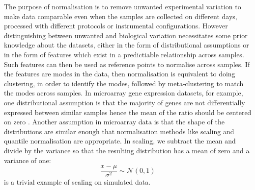 The purpose of normalisation is to remove unwanted experimental variation to make data comparable even when the samples are
collected on different days, processed with different protocols or instrumental configurations.
However distinguishing between unwanted and biological variation necessitates some prior knowledge about the datasets, either in the form of distributional assumptions
or in the form of features which exist in a predictiable relationship across samples.
Such features can then be used as reference points to normalise across samples.
If the features are modes in the data, then normalisation is equivalent to doing clustering, in order to identify the modes,
followed by meta-clustering to match the modes across samples.
In microarray gene expression datasets, for example, one distributional assumption is that the majority of genes are not differentially expressed between similar samples
hence the mean of the ratio should be centered on zero \citet{Smyth:2003ie,Bolstad:2003ia}.
Another assumption in microarray data is that the shape of the distributions are similar enough that normalisation  methods like scaling and quantile normalisation
are appropriate.  In scaling, we subtract the mean and divide by the variance so that the resulting distribution has a mean of zero and a variance of one:
\[
  \frac{x-\mu}{\sigma^2} \sim \mathcal{N}(0,1)
\]
 is a trivial example of scaling on simulated data.

